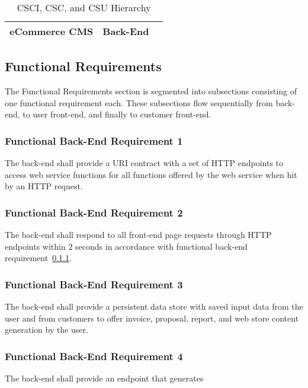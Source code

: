 \documentclass{article}
\begin{document}
\begin{table}
\begin{tabular}{|c|c|c|}\hline
eCommerce CMS & Back-End & \\\hline
\end{tabular}
\caption{CSCI, CSC, and CSU Hierarchy}
\label{software-hierarchy}
\end{table}

\subsection{Functional Requirements}

The Functional Requirements section is segmented into subsections consisting of
one functional requirement each.  These subsections flow sequentially from
back-end, to user front-end, and finally to customer front-end.

\subsubsection{Functional Back-End Requirement 1}
\label{func-back-end-1}

The back-end shall provide a URI contract with a set of HTTP endpoints
to access web service functions for all functions offered by the web service
when hit by an HTTP request.

\subsubsection{Functional Back-End Requirement 2}
\label{func-back-end-2}

The back-end shall respond to all front-end page requests through HTTP endpoints
within 2 seconds in accordance with functional back-end
requirement~\ref{func-back-end-1}.

\subsubsection{Functional Back-End Requirement 3}
\label{func-back-end-3}

The back-end shall provide a persistent data store with saved input data from
the user and from customers to offer invoice, proposal, report, and web store
content generation by the user.

\subsubsection{Functional Back-End Requirement 4}
\label{func-back-end-4}
The back-end shall provide an endpoint that generates
\end{document}
